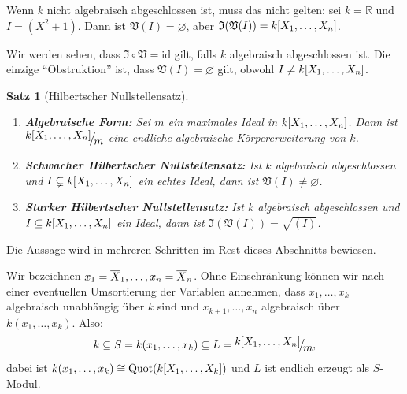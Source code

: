 \documentclass[a4paper,12pt]{scrbook}
\newtheorem{satz}{Satz}
\def\V{\mathfrak{V}}
\def\I{\mathfrak{I}}
\newcommand{\id}{\mathrm{id}}
\newcommand{\leer}{\ensuremath{\varnothing}}
\newcommand{\Quot}{\mathrm{Quot}}
\newcommand{\set}[1]{\ensuremath{\mathbb{#1}}}
\newcommand{\R}{\set{R}}
\def\Bar#1{\ensuremath\overline{#1}}
\newcommand{\Quotient}[2]{
  \raisebox{0.7ex}{\ensuremath{#1}}
  \ensuremath{\mkern-3mu}\big/\ensuremath{\mkern-3mu}
  \raisebox{-0.6ex}{\ensuremath{#2}}}
\newcommand{\polyx}[1][n]{\ensuremath%
  [X_{1},\dotsc,X_{#1}]}
\begin{document}
\begin{nbsp}
  Wenn $k$ nicht algebraisch abgeschlossen ist, muss das nicht gelten: sei $k=\R$ und $I=(X^2+1)$. Dann ist $\V(I)=\leer$, aber
  $\I(\V(I)) = k\polyx$.
\end{nbsp}

Wir werden sehen, dass $\I\circ\V=\id$ gilt, falls $k$ algebraisch abgeschlossen ist. Die einzige \enquote{Obstruktion} ist,
dass $\V(I)=\leer$ gilt, obwohl $I\neq k\polyx$.

\begin{satz}[Hilbertscher Nullstellensatz]\label{satz2}\label{HNS}
  \begin{enumerate}
  \item{} {\bf Algebraische Form:} Sei $m$ ein maximales Ideal in $k\polyx$. Dann ist $\Quotient{k\polyx}{m}$ eine
    endliche algebraische Körpererweiterung von $k$.
  \item {\bf Schwacher Hilbertscher Nullstellensatz:} Ist $k$ algebraisch abgeschlossen und $I\subsetneq k\polyx$
    ein echtes Ideal, dann ist $\V(I)\neq\leer$.
  \item {\bf Starker Hilbertscher Nullstellensatz:} Ist $k$ algebraisch abgeschlossen und $I\subseteq k\polyx$ ein
    Ideal, dann ist $\I(\V(I))=\sqrt{(I)}$.
  \end{enumerate}
\end{satz}

Die Aussage wird in mehreren Schritten im Rest dieses Abschnitts bewiesen.

Wir bezeichnen $x_1=\Bar{X}_1,\dotsc,x_n=\Bar{X}_n$. Ohne Einschränkung können wir nach einer eventuellen Umsortierung
der Variablen annehmen, dass $x_1,\dotsc,x_k$ algebraisch unabhängig über $k$ sind und $x_{k+1},\dotsc,x_n$ algebraisch über
$k(x_1,\dotsc,x_k)$. Also:
\[ k \subseteq S = k(x_1,\dotsc,x_k) \subseteq L=\Quotient{k\polyx}{m}, \]
dabei ist $k(x_1,\dotsc,x_k)\cong\Quot(k\polyx[k])$ und $L$ ist endlich erzeugt als $S$-Modul.
\end{document}
